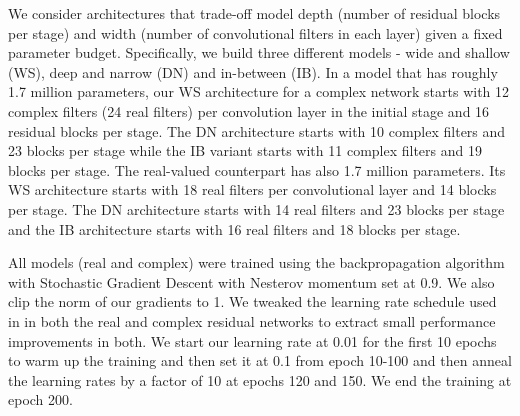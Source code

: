 \documentclass{article}
\begin{document}
We consider architectures that trade-off model depth (number of residual blocks per stage) and width (number of convolutional filters in each layer) given a fixed parameter budget. Specifically, we build three different models - wide and shallow (WS), deep and narrow (DN) and in-between (IB). In a model that has roughly 1.7 million parameters, our WS architecture for a complex network starts with 12 complex filters (24 real filters) per convolution layer in the initial stage and 16 residual blocks per stage. The DN architecture starts with 10 complex filters and 23 blocks per stage while the IB variant starts with 11 complex filters and 19 blocks per stage. The real-valued counterpart has also 1.7 million parameters. Its WS architecture starts with 18 real filters per convolutional layer and 14 blocks per stage. The DN architecture starts with 14 real filters and 23 blocks per stage and the IB architecture starts with 16 real filters and 18 blocks per stage.

All models (real and complex) were trained using the backpropagation algorithm with Stochastic Gradient Descent with Nesterov momentum \citep{nesterov1983method} set at 0.9. We also clip the norm of our gradients to 1. We tweaked the learning rate schedule used in \cite{he2016identity} in both the real and complex residual networks to extract small performance improvements in both. We start our learning rate at 0.01 for the first 10 epochs to warm up the training and then set it at 0.1 from epoch 10-100 and then anneal the learning rates by a factor of 10 at epochs 120 and 150. We end the training at epoch 200.
\end{document}
